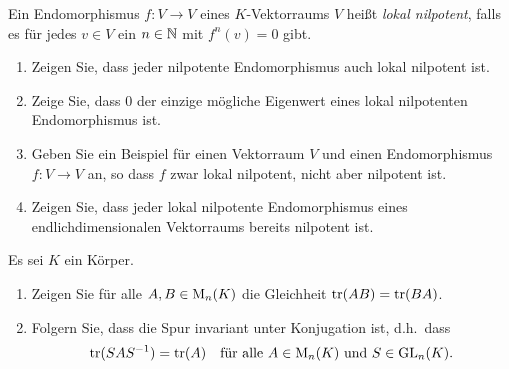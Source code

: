 \documentclass[a4paper,10pt]{scrartcl}
\begin{document}
\begin{question}
  Ein Endomorphismus $f \colon V \to V$ eines $K$-Vektorraums $V$ heißt \emph{lokal nilpotent}, falls es für jedes $v \in V$ ein $n \in \mathbb{N}$ mit $f^n(v) = 0$ gibt.
  \begin{enumerate}[leftmargin=*]
    \item
      Zeigen Sie, dass jeder nilpotente Endomorphismus auch lokal nilpotent ist.
    \item
      Zeige Sie, dass $0$ der einzige mögliche Eigenwert eines lokal nilpotenten Endomorphismus ist.
    \item
      Geben Sie ein Beispiel für einen Vektorraum $V$ und einen Endomorphismus $f \colon V \to V$ an, so dass $f$ zwar lokal nilpotent, nicht aber nilpotent ist.
    \item
      Zeigen Sie, dass jeder lokal nilpotente Endomorphismus eines endlichdimensionalen Vektorraums bereits nilpotent ist.
  \end{enumerate}
\end{question}


\begin{question}
  Es sei $K$ ein Körper.
  \begin{enumerate}[leftmargin=*]
    \item
      Zeigen Sie für alle $A, B \in \operatorname{M}_n(K)$ die Gleichheit $\operatorname{tr}(AB) = \operatorname{tr}(BA)$.
    \item
      Folgern Sie, dass die Spur invariant unter Konjugation ist, d.h.\ dass
      \[
        \operatorname{tr}(S A S^{-1}) = \operatorname{tr}(A)
        \quad
        \text{für alle $A \in \operatorname{M}_n(K)$ und $S \in \operatorname{GL}_n(K)$}.
      \]
  \end{enumerate}
\end{question}
\end{document}
